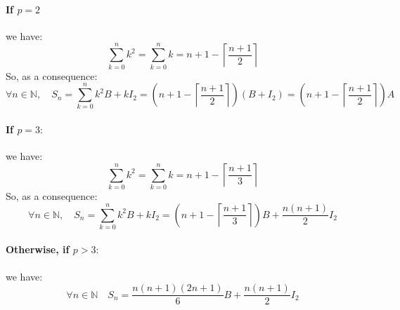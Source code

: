 \documentclass[]{article}
\begin{document}
\paragraph{If $p=2$}
we have:
$$
\sum_{k=0}^n k^2=\sum_{k=0}^nk=n+1-\left\lceil \frac{n+1}{2}\right\rceil
$$
So, as a consequence:
$$
\boxed{\forall n\in\mathbb{N},\quad S_n=\sum_{k=0}^nk^2B+kI_2=\left(n+1-\left\lceil \frac{n+1}{2}\right\rceil\right)(B+I_2)=\left(n+1-\left\lceil \frac{n+1}{2}\right\rceil\right)A}
$$

\paragraph{If $p=3:$}
we have:
$$
\sum_{k=0}^n k^2=\sum_{k=0}^nk=n+1-\left\lceil \frac{n+1}{3}\right\rceil
$$
So, as a consequence:
$$
\boxed{\forall n\in\mathbb{N},\quad S_n=\sum_{k=0}^nk^2B+kI_2=\left(n+1-\left\lceil \frac{n+1}{3}\right\rceil\right)B+\frac{n(n+1)}{2}I_2}
$$

\paragraph{Otherwise, if $p>3:$} we have:
$$
\boxed{\forall n\in\mathbb{N}\quad S_n=\frac{n(n+1)(2n+1)}{6}B+\frac{n(n+1)}{2}I_2}
$$
\pagebreak
\end{document}
